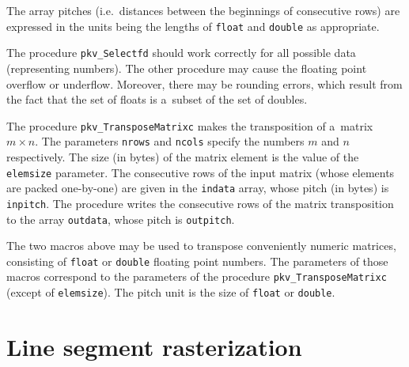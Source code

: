The array pitches (i.e.\ distances between the beginnings of consecutive rows)
are expressed in the units being the lengths of \texttt{float} and \texttt{double}
as appropriate.

The procedure \texttt{pkv\_Selectfd} should work correctly for all possible
data (representing numbers). The other procedure may cause the floating
point overflow or underflow. Moreover, there may be rounding errors, which
result from the fact that the set of floats is a~subset of the set of doubles.

\vspace{\bigskipamount}
The procedure \texttt{pkv\_TransposeMatrixc} makes the transposition of
a~matrix $m\times n$. The parameters \texttt{nrows} and \texttt{ncols}
specify the numbers $m$ and $n$ respectively. The size (in bytes)
of the matrix element is the value of the \texttt{elemsize} parameter.
The consecutive rows of the input matrix (whose elements are packed one-by-one)
are given in the \texttt{indata} array, whose pitch (in bytes) is
\texttt{inpitch}. The procedure writes the consecutive rows of the matrix
transposition to the array \texttt{outdata}, whose pitch is \texttt{outpitch}.

\vspace{\bigskipamount}
The two macros above may be used to transpose conveniently numeric matrices,
consisting of \texttt{float} or \texttt{double} floating point numbers.
The parameters of those macros correspond to the parameters of the procedure
\texttt{pkv\_TransposeMatrixc} (except of \texttt{elemsize}).
The pitch unit is the size of \texttt{float} or \texttt{double}. 


\newpage
\section{Line segment rasterization}

